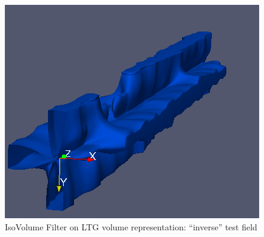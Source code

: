 \documentclass{scrartcl}
\begin{document}
\begin{figure}[!t]
\begin{minipage}{0.3\textwidth}
  \end{minipage}
   \begin{minipage}{0.3\textwidth}
    \includegraphics[height=\textwidth]{img/inverse_contour.png}
  \end{minipage}
    \caption{IsoVolume Filter on LTG volume representation: ``inverse'' test field}
\label{inverse_contour}
\end{figure}
\end{document}
